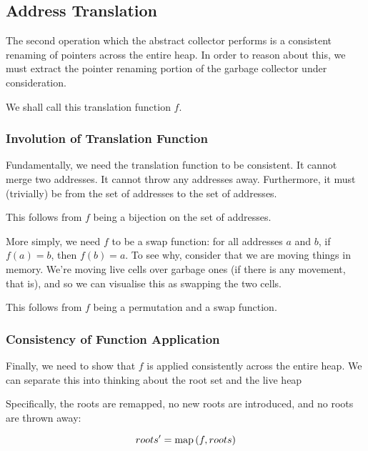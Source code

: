 \subsection{Address Translation}

The second operation which the abstract \gls{collector} performs is a
consistent renaming of \glspl{pointer} across the entire
\gls{heap}. In order to reason about this, we must extract the
\gls{pointer} renaming portion of the \gls{garbage collector} under
consideration.

We shall call this translation function $f$.

\subsubsection{Involution of Translation Function}

Fundamentally, we need the translation function to be consistent. It
cannot merge two addresses. It cannot throw any addresses
away. Furthermore, it must (trivially) be from the set of addresses to
the set of addresses.

\begin{lemma}[$f$ is a permutation]
  This follows from $f$ being a bijection on the set of addresses.
\end{lemma}

More simply, we need $f$ to be a swap function: for all addresses $a$
and $b$, if $f(a) = b$, then $f(b) = a$. To see why, consider that we
are moving things in memory. We're moving \glspl{live cell} over
\gls{garbage} ones (if there is any movement, that is), and so we can
visualise this as swapping the two \glspl{cell}.

\begin{lemma}[$f$ is an involution]
  This follows from $f$ being a permutation and a swap function.
\end{lemma}

\subsubsection{Consistency of Function Application}

Finally, we need to show that $f$ is applied consistently across the
entire \gls{heap}. We can separate this into thinking about the
\gls{root} set and the live \gls{heap}

\begin{lemma}
  Specifically, the roots are remapped, no new roots are introduced,
  and no roots are thrown away:

  \[roots' = \mathrm{map}\left(f, roots\right)\]
\end{lemma}

